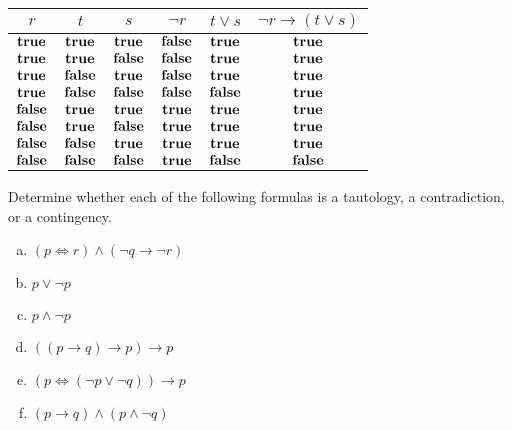 \documentclass{article}
\begin{document}
\begin{center}
\begin{tabular}{c|c|c||c|c|c}
    $r$ & $t$ & $s$ & $\neg r$ & $t \vee s$ & $\neg r \to (t \vee s)$ \\
    \hline
    $\mathbf{true}$  & $\mathbf{true}$  & $\mathbf{true}$  & $\mathbf{false}$ & $\mathbf{true}$  & $\mathbf{true}$  \\
    $\mathbf{true}$  & $\mathbf{true}$  & $\mathbf{false}$ & $\mathbf{false}$ & $\mathbf{true}$  & $\mathbf{true}$  \\
    $\mathbf{true}$  & $\mathbf{false}$ & $\mathbf{true}$  & $\mathbf{false}$ & $\mathbf{true}$  & $\mathbf{true}$  \\
    $\mathbf{true}$  & $\mathbf{false}$ & $\mathbf{false}$ & $\mathbf{false}$ & $\mathbf{false}$ & $\mathbf{true}$  \\
    $\mathbf{false}$ & $\mathbf{true}$  & $\mathbf{true}$  & $\mathbf{true}$  & $\mathbf{true}$  & $\mathbf{true}$  \\
    $\mathbf{false}$ & $\mathbf{true}$  & $\mathbf{false}$ & $\mathbf{true}$  & $\mathbf{true}$  & $\mathbf{true}$  \\
    $\mathbf{false}$ & $\mathbf{false}$ & $\mathbf{true}$  & $\mathbf{true}$  & $\mathbf{true}$  & $\mathbf{true}$  \\
    $\mathbf{false}$ & $\mathbf{false}$ & $\mathbf{false}$ & $\mathbf{true}$  & $\mathbf{false}$ & $\mathbf{false}$ \\
\end{tabular}
\end{center}

\begin{prob}{3.2}
    Determine whether each of the following formulas is a tautology, a contradiction, or a contingency.
    \begin{multicols}{2}
    \begin{enumerate}[a)]
    \item $(p \iff r) \wedge (\neg q \to \neg r)$
    \item $p \vee \neg p$
    \item $p \wedge \neg p$
    \item $((p \to q) \to p) \to p$
    \item $(p \iff (\neg p \vee \neg q)) \to p$
    \item $(p \to q) \wedge (p \wedge \neg q)$
    \end{enumerate}
    \end{multicols}
\end{prob}
\end{document}
